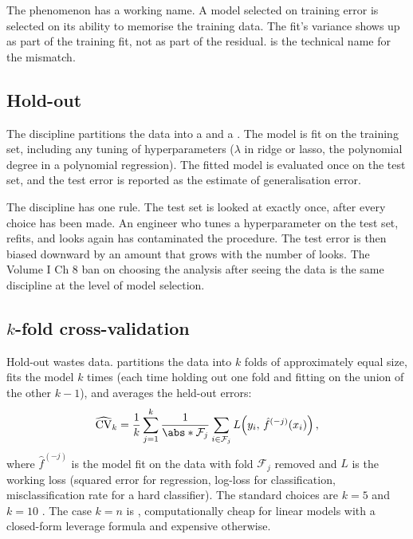 The phenomenon has a working name. A model selected on training
error is selected on its ability to memorise the training data. The
fit's variance shows up as part of the training fit, not as part of
the residual.  is the technical name for the
mismatch.

\subsection{Hold-out}

The  discipline partitions the data into a
 and a . The model is fit
on the training set, including any tuning of hyperparameters
($\lambda$ in ridge or lasso, the polynomial degree in a polynomial
regression). The fitted model is evaluated once on the test set,
and the test error is reported as the estimate of generalisation
error.

The discipline has one rule. The test set is looked at exactly
once, after every choice has been made. An engineer who tunes a
hyperparameter on the test set, refits, and looks again has
contaminated the procedure. The test error is then biased downward
by an amount that grows with the number of looks. The Volume I Ch
8 ban on choosing the analysis after seeing the data is the same
discipline at the level of model selection.



\subsection{$k$-fold cross-validation}

Hold-out wastes data.  partitions
the data into $k$ folds of approximately equal size, fits the model
$k$ times (each time holding out one fold and fitting on the union
of the other $k-1$), and averages the held-out errors:
\[
\widehat{\mathrm{CV}}_{k}
 = \frac{1}{k}\sum_{j=1}^{k}
   \frac{1}{\abs*{\mathcal{F}_{j}}}
   \sum_{i \in \mathcal{F}_{j}}
   L\!\left(y_{i},\, \hat{f}^{(-j)}(x_{i})\right),
\]
where $\hat{f}^{(-j)}$ is the model fit on the data with fold
$\mathcal{F}_{j}$ removed and $L$ is the working loss (squared
error for regression, log-loss for classification, misclassification
rate for a hard classifier). The standard choices are $k = 5$ and
$k = 10$ \cite[ch.~21]{text:wasserman2004}. The case $k = n$ is
, computationally cheap for
linear models with a closed-form leverage formula and expensive
otherwise.

